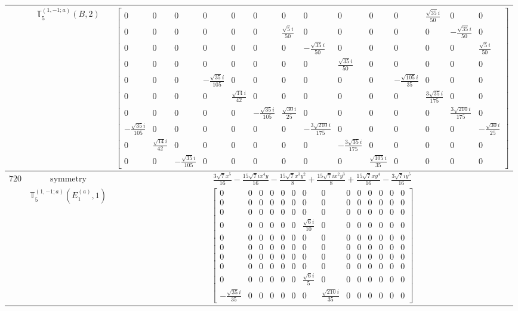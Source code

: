 \documentclass[fleqn,8pt,landscape]{jsarticle}
\begin{document}
\begin{longtable}{ccc}
$  $ & $ \mathbb{T}_{5}^{(1,-1;a)}(B,2) $ & $ \begin{bmatrix} 0 & 0 & 0 & 0 & 0 & 0 & 0 & 0 & 0 & 0 & 0 & \frac{\sqrt{35} i}{50} & 0 & 0 \\ 0 & 0 & 0 & 0 & 0 & 0 & \frac{\sqrt{5} i}{50} & 0 & 0 & 0 & 0 & 0 & - \frac{\sqrt{35} i}{50} & 0 \\ 0 & 0 & 0 & 0 & 0 & 0 & 0 & - \frac{\sqrt{35} i}{50} & 0 & 0 & 0 & 0 & 0 & \frac{\sqrt{5} i}{50} \\ 0 & 0 & 0 & 0 & 0 & 0 & 0 & 0 & \frac{\sqrt{35} i}{50} & 0 & 0 & 0 & 0 & 0 \\ 0 & 0 & 0 & - \frac{\sqrt{35} i}{105} & 0 & 0 & 0 & 0 & 0 & 0 & - \frac{\sqrt{105} i}{35} & 0 & 0 & 0 \\ 0 & 0 & 0 & 0 & \frac{\sqrt{14} i}{42} & 0 & 0 & 0 & 0 & 0 & 0 & \frac{3 \sqrt{35} i}{175} & 0 & 0 \\ 0 & 0 & 0 & 0 & 0 & - \frac{\sqrt{35} i}{105} & \frac{\sqrt{30} i}{25} & 0 & 0 & 0 & 0 & 0 & \frac{3 \sqrt{210} i}{175} & 0 \\ - \frac{\sqrt{35} i}{105} & 0 & 0 & 0 & 0 & 0 & 0 & - \frac{3 \sqrt{210} i}{175} & 0 & 0 & 0 & 0 & 0 & - \frac{\sqrt{30} i}{25} \\ 0 & \frac{\sqrt{14} i}{42} & 0 & 0 & 0 & 0 & 0 & 0 & - \frac{3 \sqrt{35} i}{175} & 0 & 0 & 0 & 0 & 0 \\ 0 & 0 & - \frac{\sqrt{35} i}{105} & 0 & 0 & 0 & 0 & 0 & 0 & \frac{\sqrt{105} i}{35} & 0 & 0 & 0 & 0 \end{bmatrix} $ \\ \hline
$ 720 $ & $ \text{symmetry} $ & $ \frac{3 \sqrt{7} x^{5}}{16} - \frac{15 \sqrt{7} i x^{4} y}{16} - \frac{15 \sqrt{7} x^{3} y^{2}}{8} + \frac{15 \sqrt{7} i x^{2} y^{3}}{8} + \frac{15 \sqrt{7} x y^{4}}{16} - \frac{3 \sqrt{7} i y^{5}}{16} $ \\
$  $ & $ \mathbb{T}_{5}^{(1,-1;a)}(E_{1}^{(a)},1) $ & $ \begin{bmatrix} 0 & 0 & 0 & 0 & 0 & 0 & 0 & 0 & 0 & 0 & 0 & 0 & 0 & 0 \\ 0 & 0 & 0 & 0 & 0 & 0 & 0 & 0 & 0 & 0 & 0 & 0 & 0 & 0 \\ 0 & 0 & 0 & 0 & 0 & 0 & 0 & 0 & 0 & 0 & 0 & 0 & 0 & 0 \\ 0 & 0 & 0 & 0 & 0 & 0 & \frac{\sqrt{6} i}{10} & 0 & 0 & 0 & 0 & 0 & 0 & 0 \\ 0 & 0 & 0 & 0 & 0 & 0 & 0 & 0 & 0 & 0 & 0 & 0 & 0 & 0 \\ 0 & 0 & 0 & 0 & 0 & 0 & 0 & 0 & 0 & 0 & 0 & 0 & 0 & 0 \\ 0 & 0 & 0 & 0 & 0 & 0 & 0 & 0 & 0 & 0 & 0 & 0 & 0 & 0 \\ 0 & 0 & 0 & 0 & 0 & 0 & 0 & 0 & 0 & 0 & 0 & 0 & 0 & 0 \\ 0 & 0 & 0 & 0 & 0 & 0 & \frac{\sqrt{6} i}{5} & 0 & 0 & 0 & 0 & 0 & 0 & 0 \\ - \frac{\sqrt{35} i}{35} & 0 & 0 & 0 & 0 & 0 & 0 & \frac{\sqrt{210} i}{35} & 0 & 0 & 0 & 0 & 0 & 0 \end{bmatrix} $ \\ \hline

\end{longtable}
\end{document}

